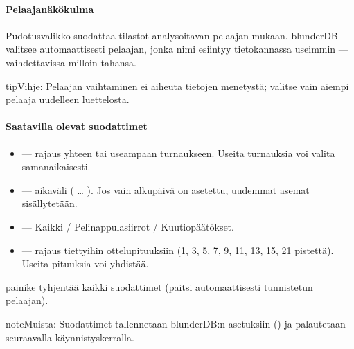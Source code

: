 \documentclass[letterpaper,10pt,finnish]{sphinxmanual}
\begin{document}
\paragraph{Pelaajanäkökulma}
\label{\detokenize{manuel:perspective-joueur}}
\sphinxAtStartPar
Pudotusvalikko  suodattaa tilastot analysoitavan pelaajan mukaan. blunderDB valitsee automaattisesti pelaajan, jonka nimi esiintyy tietokannassa useimmin — vaihdettavissa milloin tahansa.

\begin{sphinxadmonition}{tip}{Vihje:}
\sphinxAtStartPar
Pelaajan vaihtaminen ei aiheuta tietojen menetystä; valitse vain aiempi pelaaja uudelleen luettelosta.
\end{sphinxadmonition}


\paragraph{Saatavilla olevat suodattimet}
\label{\detokenize{manuel:filtres-disponibles}}\begin{itemize}
\item {} 
\sphinxAtStartPar
{} — rajaus yhteen tai useampaan turnaukseen. Useita turnauksia voi valita samanaikaisesti.

\item {} 
\sphinxAtStartPar
{} — aikaväli ( … ). Jos vain alkupäivä on asetettu, uudemmat asemat sisällytetään.

\item {} 
\sphinxAtStartPar
{} — Kaikki / Pelinappulasiirrot / Kuutiopäätökset.

\item {} 
\sphinxAtStartPar
{} — rajaus tiettyihin ottelupituuksiin (1, 3, 5, 7, 9, 11, 13, 15, 21 pistettä). Useita pituuksia voi yhdistää.

\end{itemize}

\sphinxAtStartPar
{}\sphinxhyphen{}painike tyhjentää kaikki suodattimet (paitsi automaattisesti tunnistetun pelaajan).

\begin{sphinxadmonition}{note}{Muista:}
\sphinxAtStartPar
Suodattimet tallennetaan blunderDB:n asetuksiin () ja palautetaan seuraavalla käynnistyskerralla.
\end{sphinxadmonition}
\end{document}
